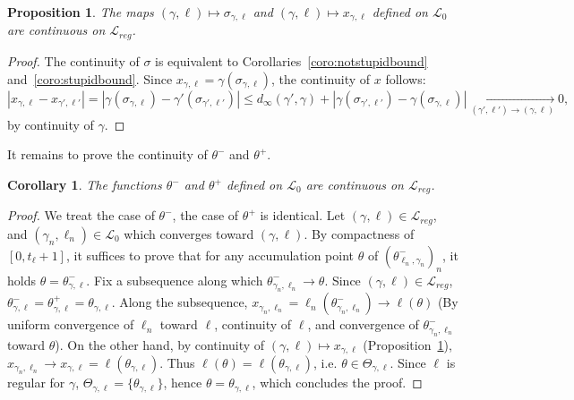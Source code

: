 \documentclass[11pt]{article}
\newtheorem{proposition}[theorem]{Proposition}
\newtheorem{corollary}[theorem]{Corollary}
\begin{document}
\begin{proposition}
    \label{prop:sigmaxcont}
    The maps $(\gamma,\ell)\mapsto \sigma_{\gamma,\ell}$ and $(\gamma,\ell)\mapsto x_{\gamma,\ell}$ defined on $\mathscr{L}_0$ are continuous on $\mathscr{L}_{reg}$.
\end{proposition}
\begin{proof}
    The continuity of $\sigma$ is equivalent to Corollaries~\ref{coro:notstupidbound} and~\ref{coro:stupidbound}. Since $x_{\gamma,\ell}=\gamma(\sigma_{\gamma,\ell} )$, the continuity of $x$ follows:
    \[
    |x_{\gamma,\ell}-x_{\gamma',\ell'}|=|\gamma(\sigma_{\gamma,\ell} )-\gamma'(\sigma_{\gamma',\ell'} )|
		\leq d_\infty(\gamma',\gamma)+ |\gamma(\sigma_{\gamma',\ell'})-\gamma(\sigma_{\gamma,\ell})|\underset{(\gamma',\ell')\to (\gamma,\ell)}\longrightarrow 0,
    \]
    by continuity of $\gamma$.
\end{proof}
It remains to prove the continuity of $\theta^-$ and $\theta^+$.

\begin{corollary}
  \label{coro:thetacont}
  The functions $\theta^-$ and $\theta^+$ defined on $\mathscr{L}_0$ are continuous on $\mathscr{L}_{reg}$.
\end{corollary}
\begin{proof}
    We treat the case of $\theta^-$, the case of $\theta^+$ is identical.    Let $(\gamma,\ell)\in \mathscr{L}_{reg}$, and $(\gamma_n, \ell_n)\in \mathscr{L}_0$ which converges toward $(\gamma, \ell)$.
    By compactness of $[0,t_\ell+1]$, it suffices to prove that for any accumulation point $\theta$ of $(\theta^-_{\ell_n, \gamma_n})_n$, it holds
    $\theta=\theta^-_{\gamma,\ell}$.
    Fix a subsequence along which $\theta^-_{\gamma_n,\ell_n}\to \theta$. Since $(\gamma,\ell)\in \mathcal{L}_{reg}$,
     $\theta^-_{\gamma,\ell}=\theta^+_{\gamma,\ell}=\theta_{\gamma,\ell}$. Along the subsequence, $x_{\gamma_n,\ell_n}=\ell_n(\theta^-_{\gamma_n,\ell_n})\to \ell(\theta)$ (By uniform convergence of $\ell_n$ toward $\ell$, continuity of $\ell$, and convergence of $\theta^-_{\gamma_n,\ell_n}$ toward $\theta$).
      On the other hand, by continuity of $(\gamma,\ell)\mapsto x_{\gamma,\ell}$ (Proposition~\ref{prop:sigmaxcont}), $x_{\gamma_n,\ell_n}\to x_{\gamma,\ell}= \ell(\theta_{\gamma,\ell})$. Thus
    $ \ell(\theta)=  \ell(\theta_{\gamma,\ell})$, i.e. $\theta\in \Theta_{\gamma,\ell}$. Since $\ell$ is regular for $\gamma$, $\Theta_{\gamma,\ell}=\{\theta_{\gamma,\ell}\}$, hence $\theta=\theta_{\gamma,\ell}$, which concludes the proof.
\end{proof}
\end{document}
